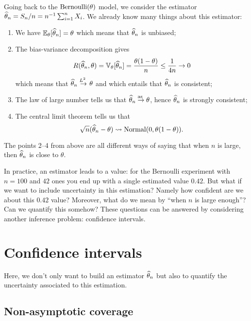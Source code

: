 Going back to the $\operatorname{Bernoulli}(\theta)$ model, we consider the estimator $\widehat \theta_n = S_n / n = n^{-1} \sum_{i=1}^n X_i$.
We already know many things about this estimator:
\begin{enumerate}
	\item We have $\mathbb E_\theta [\widehat \theta_n] = \theta$ which means that $\widehat \theta_n$ is unbiased;
	\item The bias-variance decomposition gives
	\begin{equation}
		\label{eq:bernoulli-quadratic-risk}
	 	R(\widehat \theta_n, \theta) = \mathbb V_\theta[\widehat \theta_n] = \frac{\theta (1 - \theta)}{n} \leq 
	 	\frac{1}{4 n} \rightarrow 0
	 \end{equation}
	 which means that $\widehat \theta_n \overset{\text{$L^2$\ }}{\rightarrow} \theta$ and which entails that $\widehat \theta_n$ is consistent;
	\item The law of large number tells us that $\widehat \theta_n \overset{\text{as\ }}{\rightarrow} \theta$, hence $\widehat \theta_n$ is strongly consistent;
	\item The central limit theorem tells us that
	\begin{equation}
	\label{eq:tcl-bernoulli}
	\sqrt n (\widehat \theta_n - \theta) \leadsto \operatorname{Normal}(0, \theta(1 - \theta)).
	\end{equation}
\end{enumerate}
The points 2--4 from above are all different ways of saying that when $n$ is large, then $\widehat \theta_n$ is close to $\theta$.

In practice, an estimator leads to a value: for the Bernoulli experiment with $n=100$ and $42$ ones you end up with a single estimated value $0.42$.
But what if we want to include uncertainty in this estimation?
Namely how confident are we about this $0.42$ value?
Moreover, what do we mean by ``when $n$ is large enough''? 
Can we quantify this somehow?
These questions can be answered by considering another inference problem: confidence intervals.

\section{Confidence intervals} %
\label{sec:confidence_intervals}

Here, we don't only want to build an estimator $\widehat \theta_n$ but also to quantify the uncertainty associated to this estimation.

\subsection{Non-asymptotic coverage} %
\label{sub:non_asymptotic_coverage}

